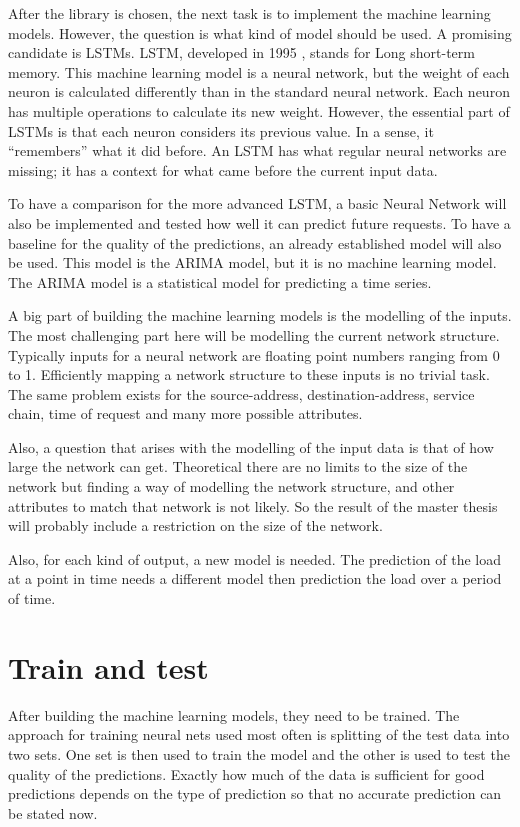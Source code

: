 \documentclass[12pt,a4paper]{article}
\begin{document}
	After the library is chosen, the next task is to implement the machine learning models. However, the question is what kind of model should be used. A promising candidate is LSTMs. LSTM, developed in 1995 \cite{lstmOrig}, stands for Long short-term memory. This machine learning model is a neural network, but the weight of each neuron is calculated differently than in the standard neural network. Each neuron has multiple operations to calculate its new weight. However, the essential part of LSTMs is that each neuron considers its previous value. In a sense, it “remembers” what it did before. An LSTM has what regular neural networks are missing; it has a context for what came before the current input data. 
	
	To have a comparison for the more advanced LSTM, a basic Neural Network will also be implemented and tested how well it can predict future requests.
	To have a baseline for the quality of the predictions, an already established model will also be used. This model is the ARIMA model, but it is no machine learning model. The ARIMA model is a statistical model for predicting a time series.
	
	A big part of building the machine learning models is the modelling of the inputs. The most challenging part here will be modelling the current network structure. Typically inputs for a neural network are floating point numbers ranging from 0 to 1. Efficiently mapping a network structure to these inputs is no trivial task. The same problem exists for the source-address, destination-address, service chain, time of request and many more possible attributes.
	
	Also, a question that arises with the modelling of the input data is that of how large the network can get. Theoretical there are no limits to the size of the network but finding a way of modelling the network structure, and other attributes to match that network is not likely. So the result of the master thesis will probably include a restriction on the size of the network.
	
	Also, for each kind of output, a new model is needed. The prediction of the load at a point in time needs a different model then prediction the load over a period of time.
	
	\section{Train and test}
	After building the machine learning models, they need to be trained. The approach for training neural nets used most often is splitting of the test data into two sets. One set is then used to train the model and the other is used to test the quality of the predictions. Exactly how much of the data is sufficient for good predictions depends on the type of prediction so that no accurate prediction can be stated now.
	
\end{document}
